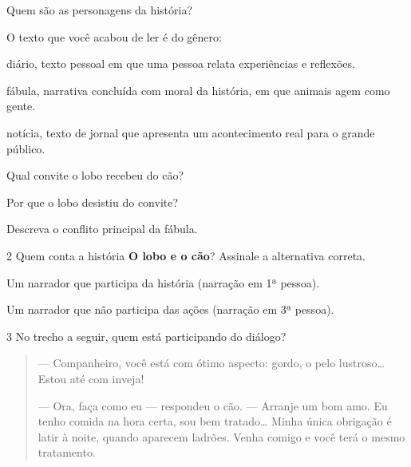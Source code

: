 \begin{escolha}
\item Quem são as personagens da história?


\item O texto que você acabou de ler é do gênero:

\begin{boxlist}
\boxitem[] diário, texto pessoal em que uma pessoa relata experiências e reflexões.

\boxitem[\rosa{X}] fábula, narrativa concluída com moral da história, em que animais agem como gente.

\boxitem[] notícia, texto de jornal que apresenta um acontecimento real para o grande público.
\end{boxlist}

\item Qual convite o lobo recebeu do cão?


\item Por que o lobo desistiu do convite?


\item Descreva o conflito principal da fábula.

\end{escolha}

\num{2} Quem conta a história \textbf{O lobo e o cão}? Assinale a alternativa correta.

\begin{boxlist}
\boxitem[] Um narrador que participa da história (narração em 1ª pessoa).

\boxitem[\rosa{X}] Um narrador que não participa das ações (narração em 3ª pessoa).
\end{boxlist}

\num{3} No trecho a seguir, quem está participando do diálogo?

\begin{quote}
--- Companheiro, você está com ótimo aspecto: gordo, o pelo
lustroso\ldots{} Estou até com inveja!

--- Ora, faça como eu --- respondeu o cão. --- Arranje um bom amo. Eu
tenho comida na hora certa, sou bem tratado\ldots{} Minha única
obrigação é latir à noite, quando aparecem ladrões. Venha comigo e você
terá o mesmo tratamento.
\end{quote}

